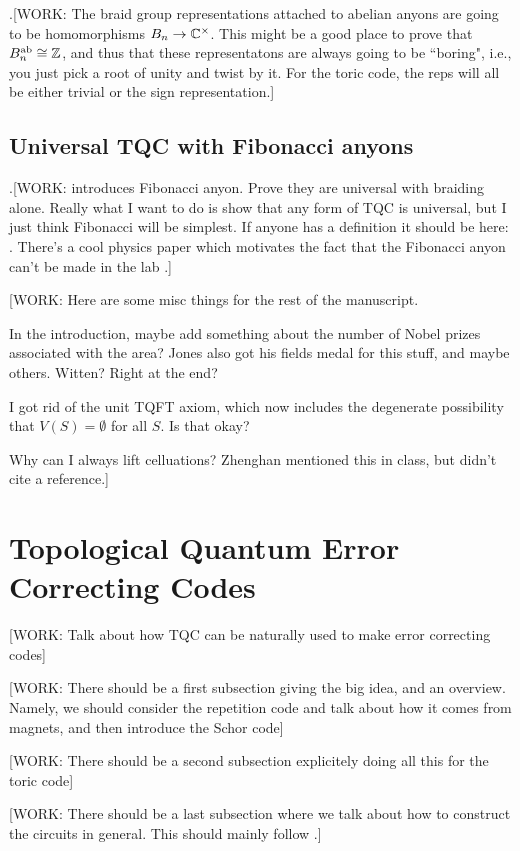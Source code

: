 \documentclass{article}
\theoremstyle{definition}
\numberwithin{figure}{section}
\begin{document}
.[WORK: The braid group representations attached to abelian anyons are going to be homomorphisms $B_n\to \mathbb{C}^\times$. This might be a good place to prove that $B_n^{\text{ab}}\cong\mathbb{Z}$, and thus that these representatons are always going to be ``boring", i.e., you just pick a root of unity and twist by it. For the toric code, the reps will all be either trivial or the sign representation.]


\subsection{Universal TQC with Fibonacci anyons}
\label{Universal TQC with Fibonacci anyons}

.[WORK: introduces Fibonacci anyon. Prove they are universal with braiding alone. Really what I want to do is show that any form of TQC is universal, but I just think Fibonacci will be simplest. If anyone has a definition it should be here: \cite{trebst2008short}. There's a cool physics paper which motivates the fact that the Fibonacci anyon can't be made in the lab \cite{freedman2012galois}.]


[WORK: Here are some misc things for the rest of the manuscript.

In the introduction, maybe add something about the number of Nobel prizes associated with the area? Jones also got his fields medal for this stuff, and maybe others. Witten? Right at the end?

I got rid of the unit TQFT axiom, which now includes the degenerate possibility that $V(S)=\emptyset$ for all $S$. Is that okay?

Why can I always lift celluations? Zhenghan mentioned this in class, but didn't cite a reference.]

\section{Topological Quantum Error Correcting Codes}

[WORK: Talk about how TQC can be naturally used to make error correcting codes]

[WORK: There should be a first subsection giving the big idea, and an overview. Namely, we should consider the repetition code and talk about how it comes from magnets, and then introduce the Schor code]

[WORK: There should be a second subsection explicitely doing all this for the toric code]

[WORK: There should be a last subsection where we talk about how to construct the circuits in general. This should mainly follow \cite{bravyi2022adaptive}.]
\end{document}
